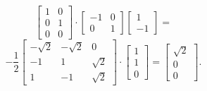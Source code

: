 \documentclass[14pt, notitlepage]{article}
\begin{document}
\begin{itemize}
\[\begin{bmatrix}
                1 & 0 \\
                0 & 1 \\
                0 & 0
            \end{bmatrix} \cdot \begin{bmatrix}
                -1 & 0 \\
                0 & 1
            \end{bmatrix} \begin{bmatrix}
                1 \\ -1
            \end{bmatrix} =
            \]
            \[
                -\frac{1}{2} \begin{bmatrix}
                -\sqrt{2} & -\sqrt{2} & 0 \\
                -1 & 1 & \sqrt{2} \\
                1 & -1 & \sqrt{2}
            \end{bmatrix} \cdot \begin{bmatrix}
                1 \\ 1 \\ 0
            \end{bmatrix} = \begin{bmatrix}
                \sqrt{2} \\ 0 \\ 0
            \end{bmatrix}.
        \]
\end{itemize}
\end{document}
